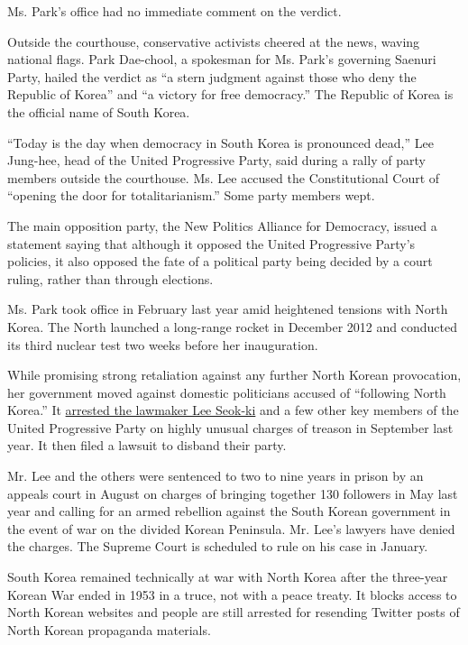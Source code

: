Ms. Park's office had no immediate comment on the verdict.

Outside the courthouse, conservative activists cheered at the news,
waving national flags. Park Dae-chool, a spokesman for Ms. Park's
governing Saenuri Party, hailed the verdict as ``a stern judgment
against those who deny the Republic of Korea'' and ``a victory for free
democracy.'' The Republic of Korea is the official name of South Korea.

``Today is the day when democracy in South Korea is pronounced dead,''
Lee Jung-hee, head of the United Progressive Party, said during a rally
of party members outside the courthouse. Ms. Lee accused the
Constitutional Court of ``opening the door for totalitarianism.'' Some
party members wept.

The main opposition party, the New Politics Alliance for Democracy,
issued a statement saying that although it opposed the United
Progressive Party's policies, it also opposed the fate of a political
party being decided by a court ruling, rather than through elections.

Ms. Park took office in February last year amid heightened tensions with
North Korea. The North launched a long-range rocket in December 2012 and
conducted its third nuclear test two weeks before her inauguration.

While promising strong retaliation against any further North Korean
provocation, her government moved against domestic politicians accused
of ``following North Korea.'' It
\href{http://www.nytimes3xbfgragh.onion/2013/09/05/world/asia/south-korean-lawmakers-back-arrest-of-colleague-for-treason.html}{arrested
the lawmaker Lee Seok-ki} and a few other key members of the United
Progressive Party on highly unusual charges of treason in September last
year. It then filed a lawsuit to disband their party.

Mr. Lee and the others were sentenced to two to nine years in prison by
an appeals court in August on charges of bringing together 130 followers
in May last year and calling for an armed rebellion against the South
Korean government in the event of war on the divided Korean Peninsula.
Mr. Lee's lawyers have denied the charges. The Supreme Court is
scheduled to rule on his case in January.

South Korea remained technically at war with North Korea after the
three-year Korean War ended in 1953 in a truce, not with a peace treaty.
It blocks access to North Korean websites and people are still arrested
for resending Twitter posts of North Korean propaganda materials.

